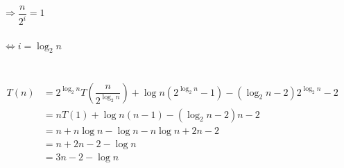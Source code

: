 \documentclass[12pt, letterpaper]{article}
\begin{document}
 \\
$\Rightarrow \dfrac{n}{2^i} = 1$ \\ \\
$\Leftrightarrow i = \log_2{n}$ \\ \\
 \\
$ \begin{aligned}
		T(n) & = 2^{\log_2{n}}T(\dfrac{n}{2^{\log_2{n}}}) + \log n(2^{\log_2{n}} - 1) - (\log_2{n} - 2)2^{\log_2{n}} - 2 \\
		     & = nT(1) + \log n(n - 1) - (\log_2{n} - 2)n - 2                                                            \\
		     & = n + n\log n - \log n - n\log n + 2n - 2                                                                 \\
		     & = n + 2n - 2 - \log n                                                                                     \\
		     & = 3n - 2 - \log n
	\end{aligned} $\\
\end{document}
